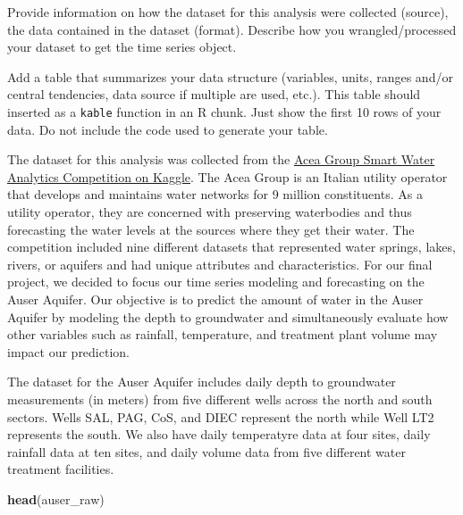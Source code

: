 \documentclass[
]{article}
\newenvironment{Shaded}{\begin{snugshade}}{\end{snugshade}}
\newcommand{\FunctionTok}[1]{\textcolor[rgb]{0.13,0.29,0.53}{\textbf{#1}}}
\newcommand{\NormalTok}[1]{#1}
\begin{document}
Provide information on how the dataset for this analysis were collected
(source), the data contained in the dataset (format). Describe how you
wrangled/processed your dataset to get the time series object.

Add a table that summarizes your data structure (variables, units,
ranges and/or central tendencies, data source if multiple are used,
etc.). This table should inserted as a \texttt{kable} function in an R
chunk. Just show the first 10 rows of your data. Do not include the code
used to generate your table.

The dataset for this analysis was collected from the
\href{https://www.kaggle.com/c/acea-water-prediction/data}{Acea Group
Smart Water Analytics Competition on Kaggle}. The Acea Group is an
Italian utility operator that develops and maintains water networks for
9 million constituents. As a utility operator, they are concerned with
preserving waterbodies and thus forecasting the water levels at the
sources where they get their water. The competition included nine
different datasets that represented water springs, lakes, rivers, or
aquifers and had unique attributes and characteristics. For our final
project, we decided to focus our time series modeling and forecasting on
the Auser Aquifer. Our objective is to predict the amount of water in
the Auser Aquifer by modeling the depth to groundwater and
simultaneously evaluate how other variables such as rainfall,
temperature, and treatment plant volume may impact our prediction.

The dataset for the Auser Aquifer includes daily depth to groundwater
measurements (in meters) from five different wells across the north and
south sectors. Wells SAL, PAG, CoS, and DIEC represent the north while
Well LT2 represents the south. We also have daily temperatyre data at
four sites, daily rainfall data at ten sites, and daily volume data from
five different water treatment facilities.

\begin{Shaded}
\begin{Highlighting}[]
\FunctionTok{head}\NormalTok{(auser\_raw)}
\end{Highlighting}
\end{Shaded}
\end{document}

